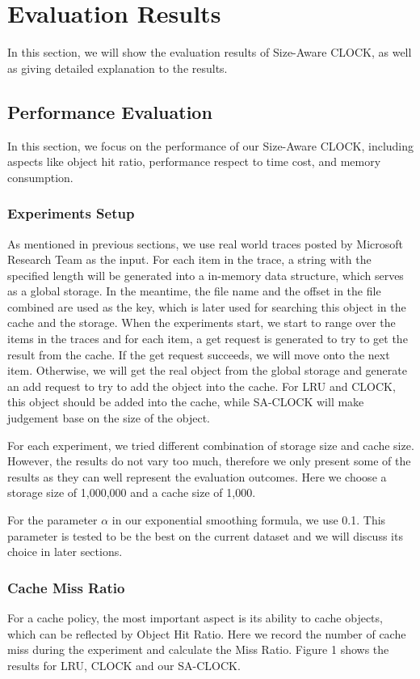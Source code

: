 \documentclass[journal,10.5pt,onecolumn]{IEEEtran}
\begin{document}
\section{Evaluation Results}
In this section, we will show the evaluation results of Size-Aware CLOCK, as well as giving detailed explanation to the results.

\subsection{Performance Evaluation}
In this section, we focus on the performance of our Size-Aware CLOCK, including aspects like object hit ratio, performance respect to time cost, and memory consumption.

\subsubsection{Experiments Setup}
As mentioned in previous sections, we use real world traces posted by Microsoft Research Team as the input. For each item in the trace, a string with the specified length will be generated into a in-memory data structure, which serves as a global storage. In the meantime, the file name and the offset in the file combined are used as the key, which is later used for searching this object in the cache and the storage. 
When the experiments start, we start to range over the items in the traces and for each item, a get request is generated to try to get the result from the cache. If the get request succeeds, we will move onto the next item. Otherwise, we will get the real object from the global storage and generate an add request to try to add the object into the cache. For LRU and CLOCK, this object should be added into the cache, while SA-CLOCK will make judgement base on the size of the object.

For each experiment, we tried different combination of storage size and cache size. However, the results do not vary too much, therefore we only present some of the results as they can well represent the evaluation outcomes. Here we choose a storage size of 1,000,000 and a cache size of 1,000.

For the parameter $\alpha$ in our exponential smoothing formula, we use 0.1. This parameter is tested to be the best on the current dataset and we will discuss its choice in later sections.

\subsubsection{Cache Miss Ratio}
For a cache policy, the most important aspect is its ability to cache objects, which can be reflected by Object Hit Ratio. Here we record the number of cache miss during the experiment and calculate the Miss Ratio. Figure 1 shows the results for LRU, CLOCK and our SA-CLOCK. 
\end{document}

